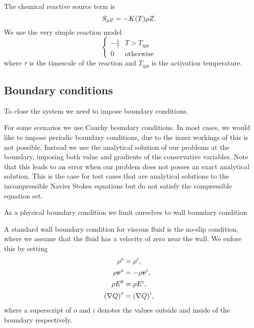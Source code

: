 \newcommand{\reactionTimescale}{\tau}
\newcommand{\reactionTemperature}{T_{\text{ign}}}
The chemical reactive source term is
\begin{equation}\label{eq:source-reaction}
  \source[\QZ] = - K(T) \QZ.
\end{equation}
We use the very simple reaction model
\begin{equation}\label{eq:reaction-model}
\begin{cases}
  - \frac{1}{\reactionTimescale} & T > \reactionTemperature\\
  0 & \text{otherwise}
\end{cases}  
\end{equation}
where $\reactionTimescale$ is the timescale of the reaction and $\reactionTemperature$ is the activation temperature.

\subsection{Boundary conditions}
To close the system we need to impose boundary conditions.

For some scenarios we use Cauchy boundary conditions.
In most cases, we would like to impose periodic boundary conditions, due to the inner workings of \exahype{} this is not possible.
Instead we use the analytical solution of our problems at the boundary, imposing both value and gradients of the conservative variables.
Note that this leads to an error when our problem does not posses an exact analytical solution.
This is the case for test cases that are analytical solutions to the incompressible Navier Stokes equations but do not satisfy the compressible equation set.

As a physical boundary condition we limit ourselves to wall boundary condition

A standard wall boundary condition for viscous fluid is the no-slip condition, where we assume that the fluid has a velocity of zero near the wall.
We enfore this by setting
\begin{align}
  \label{eq:no-slip}
  \begin{split}
  \rho^o &= \rho^i, \\
  \rho \bm{v}^o &= -\rho \bm{v}^i, \\
  \rho E^0 &= \rho E^i,\\
  {(\nabla Q)}^o &= {(\nabla Q)}^i,
  \end{split}
\end{align}
where a superscript of $o$ and $i$ denotes the values outside and inside of the boundary respectively.

